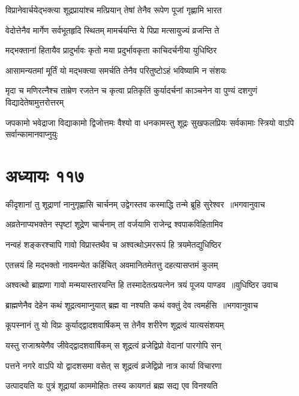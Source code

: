 \twolineshloka
{विप्रानेवार्चयेद्भक्त्या शूद्रप्रायांश्च मत्प्रियान्}
{तेषां तेनैव रूपेण पूजां गृह्णामि भारत}


\twolineshloka
{वेदोत्तेनैव मार्गेण सर्वभूतहृदि स्थितम्}
{मामर्चयन्ति ये पिप्रा मत्सायुज्यं व्रजन्ति ते}


\twolineshloka
{मद्भक्तानां हितायैव प्रादुर्भावः कृतो मया}
{प्रदुर्भावकृता काचिदर्चनीया युधिष्ठिर}


\twolineshloka
{आसामन्यतमां मूर्तिं यो मद्भक्त्या समर्चति}
{तेनैव परितुष्टोऽहं भविष्यामि न संशयः}


\threelineshloka
{मृदा च मणिरत्नैश्च ताम्रेण रजतेन च}
{कृत्वा प्रतिकृतिं कुर्यादर्चनां काञ्चनेन वा}
{पुण्यं दशगुणं विद्यादेतेषामुत्तरोत्तरम्}


\threelineshloka
{जपकामो भवेद्राजा विद्याकामो द्विजोत्तमः}
{वैश्यो वा धनकामस्तु शूद्रः सुखफलप्रियः}
{सर्वकामाः स्त्रियो वाऽपि सर्वान्कामानवाप्नुयुः}


\chapter{अध्यायः ११७}
\threelineshloka
{कीदृशानां तु शूद्राणां नानुगृह्णासि चार्चनम्}
{उद्वेगस्तव कस्माद्धि तन्मे ब्रूहि सुरेश्वर ॥भगवानुवाच}
{}


\twolineshloka
{अव्रतेनाप्यभक्तेन स्पृष्टां शूद्रेण चार्चनाम्}
{तां वर्जयामि राजेन्द्र श्वपाकविहितामिव}


\twolineshloka
{नन्वहं शङ्करश्चापि गावो विप्रास्तथैव च}
{अश्वत्थोऽमररूपं हि त्रयमेतद्युधिष्ठिर}


\twolineshloka
{एतत्त्रयं हि मद्भक्तो नावमन्येत कर्हिचित्}
{अवमानितमेतत्तु दहत्यासप्तमं कुलम्}


\threelineshloka
{अश्वत्थो ब्राह्मणा गावो मन्मयास्तारयन्ति हि}
{तस्मादेतत्प्रयत्नेन त्रयं पूजय पाण्डव ॥युधिष्ठिर उवाच}
{}


\threelineshloka
{ब्राह्मणेनैव देहेन कथं शूद्रत्वमाप्नुयात्}
{ब्रह्म वा नश्यति कथं वक्तुं देव त्वमर्हसि ॥भगवानुवाच}
{}


\twolineshloka
{कूपस्नानं तु यो विप्रः कुर्याद्द्वादशवार्षिकम्}
{स तेनैव शरीरेण शूद्रत्वं यात्यसंशयम्}


\twolineshloka
{यस्तु राजाश्रयेणैव जीवेद्द्वादशवार्षिकम्}
{स शूद्रत्वं व्रजेद्विप्रो वेदानां पारगोपि सन्}


\twolineshloka
{पत्तने नगरे वाऽपि यो द्वादशसमा वसेत्}
{स शूद्रत्वं व्रजेद्विप्रो नात्र कार्या विचारणा}


\twolineshloka
{उत्पादयति यः पुत्रं शूद्रायां काममोहितः}
{तस्य कायगतं ब्रह्म सद्य एव विनश्यति}


